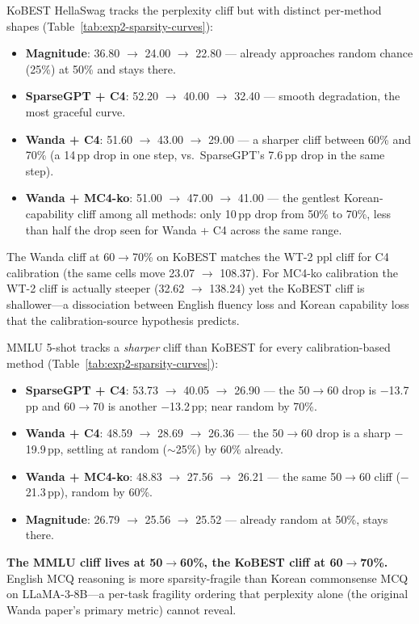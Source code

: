 \documentclass{article}
\begin{document}
KoBEST HellaSwag tracks the perplexity cliff but with distinct
per-method shapes (Table~\ref{tab:exp2-sparsity-curves}):
\begin{itemize}
  \item \textbf{Magnitude}: 36.80 $\rightarrow$ 24.00 $\rightarrow$ 22.80
        --- already approaches random chance (25\%) at 50\% and stays there.
  \item \textbf{SparseGPT + C4}: 52.20 $\rightarrow$ 40.00 $\rightarrow$ 32.40
        --- smooth degradation, the most graceful curve.
  \item \textbf{Wanda + C4}: 51.60 $\rightarrow$ 43.00 $\rightarrow$ 29.00
        --- a sharper cliff between 60\% and 70\% (a 14\,pp drop in one step,
        vs.\ SparseGPT's 7.6\,pp drop in the same step).
  \item \textbf{Wanda + MC4-ko}: 51.00 $\rightarrow$ 47.00 $\rightarrow$ 41.00
        --- the gentlest Korean-capability cliff among all methods: only
        10\,pp drop from 50\% to 70\%, less than half the drop seen for
        Wanda + C4 across the same range.
\end{itemize}

The Wanda cliff at 60$\rightarrow$70\% on KoBEST matches the WT-2 ppl
cliff for C4 calibration (the same cells move 23.07 $\rightarrow$ 108.37).
For MC4-ko calibration the WT-2 cliff is actually steeper (32.62
$\rightarrow$ 138.24) yet the KoBEST cliff is shallower---a dissociation
between English fluency loss and Korean capability loss that the
calibration-source hypothesis predicts.

MMLU 5-shot tracks a \emph{sharper} cliff than KoBEST for every
calibration-based method (Table~\ref{tab:exp2-sparsity-curves}):
\begin{itemize}
  \item \textbf{SparseGPT + C4}: 53.73 $\rightarrow$ 40.05 $\rightarrow$
        26.90 --- the 50$\rightarrow$60 drop is $-$13.7\,pp and
        60$\rightarrow$70 is another $-$13.2\,pp; near random by 70\%.
  \item \textbf{Wanda + C4}: 48.59 $\rightarrow$ 28.69 $\rightarrow$ 26.36
        --- the 50$\rightarrow$60 drop is a sharp $-$19.9\,pp, settling
        at random ($\sim$25\%) by 60\% already.
  \item \textbf{Wanda + MC4-ko}: 48.83 $\rightarrow$ 27.56 $\rightarrow$
        26.21 --- the same 50$\rightarrow$60 cliff ($-$21.3\,pp), random
        by 60\%.
  \item \textbf{Magnitude}: 26.79 $\rightarrow$ 25.56 $\rightarrow$ 25.52
        --- already random at 50\%, stays there.
\end{itemize}
\textbf{The MMLU cliff lives at 50$\rightarrow$60\%, the KoBEST cliff
at 60$\rightarrow$70\%.} English MCQ reasoning is more sparsity-fragile
than Korean commonsense MCQ on LLaMA-3-8B---a per-task fragility
ordering that perplexity alone (the original Wanda paper's primary
metric) cannot reveal.
\end{document}
